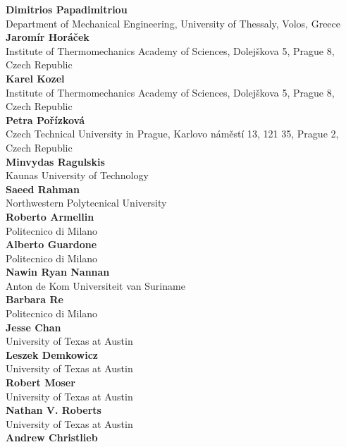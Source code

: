 \documentclass[article,A4,11pt]{llncs}%
\begin{document}
        \noindent
    {\bf Dimitrios Papadimitriou}\\
    Department of Mechanical Engineering, University of Thessaly, Volos, Greece\\
        \noindent
    {\bf Jarom\'ir Hor\'a\v{c}ek}\\
    Institute of Thermomechanics Academy of Sciences, Dolej\v{s}kova 5, Prague 8, Czech Republic\\
        \noindent
    {\bf Karel Kozel}\\
    Institute of Thermomechanics Academy of Sciences, Dolej\v{s}kova 5, Prague 8, Czech Republic\\
        \noindent
    {\bf Petra Po\v{r}\'izkov\'a}\\
    Czech Technical University in Prague, Karlovo n\'am\v{e}st\'i 13, 121 35, Prague 2, Czech Republic\\
        \noindent
    {\bf Minvydas Ragulskis}\\
    Kaunas University of Technology\\
        \noindent
    {\bf Saeed Rahman}\\
    Northwestern Polytecnical University\\
        \noindent
    {\bf Roberto Armellin}\\
    Politecnico di Milano\\
        \noindent
    {\bf Alberto Guardone}\\
    Politecnico di Milano\\
        \noindent
    {\bf Nawin Ryan Nannan}\\
    Anton de Kom Universiteit van Suriname\\
        \noindent
    {\bf Barbara Re}\\
    Politecnico di Milano\\
        \noindent
    {\bf Jesse Chan}\\
    University of Texas at Austin\\
        \noindent
    {\bf Leszek Demkowicz}\\
    University of Texas at Austin\\
        \noindent
    {\bf Robert Moser}\\
    University of Texas at Austin\\
        \noindent
    {\bf Nathan V. Roberts}\\
    University of Texas at Austin\\
        \noindent
    {\bf Andrew Christlieb}\\
\end{document}
